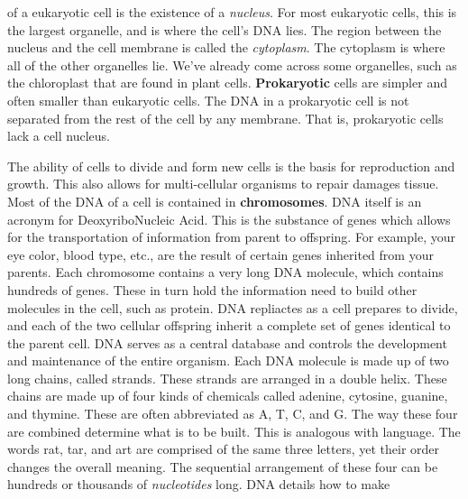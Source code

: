 \documentclass[crop=false,class=book,oneside]{standalone}
\begin{document}
        of a eukaryotic cell is the existence of a
        \textit{nucleus}. For most eukaryotic cells, this
        is the largest organelle, and is where the
        cell's DNA lies. The region between the
        nucleus and the cell membrane is called the
        \textit{cytoplasm}. The cytoplasm is where all of
        the other organelles lie. We've already come
        across some organelles, such as the chloroplast
        that are found in plant cells.
        \textbf{Prokaryotic} cells are simpler and often
        smaller than eukaryotic cells. The DNA
        in a prokaryotic cell is not separated from the
        rest of the cell by any membrane. That is,
        prokaryotic cells lack a cell nucleus.
        \par\hfill\par
        The ability of cells to divide and form new cells
        is the basis for reproduction and growth. This
        also allows for multi-cellular organisms to
        repair damages tissue. Most of the DNA of a cell
        is contained in \textbf{chromosomes}. DNA itself
        is an acronym for
        DeoxyriboNucleic Acid. This is the substance of
        genes which allows for the transportation of
        information from parent to offspring. For example,
        your eye color, blood type, etc., are the result
        of certain genes inherited from your parents.
        Each chromosome contains a very long DNA molecule,
        which contains hundreds of genes. These in turn
        hold the information need to build other molecules
        in the cell, such as protein. DNA repliactes as
        a cell prepares to divide, and each of the two
        cellular offspring inherit a complete set
        of genes identical to the parent cell. DNA
        serves as a central database and controls the
        development and maintenance of the entire
        organism. Each DNA molecule is made up of
        two long chains, called strands. These strands
        are arranged in a double helix. These chains are
        made up of four kinds of chemicals called
        adenine, cytosine, guanine, and thymine. These
        are often abbreviated as A, T, C, and G. The
        way these four are combined determine what is
        to be built. This is analogous with language.
        The words rat, tar, and art are comprised of the
        same three letters, yet their order changes the
        overall meaning. The sequential arrangement of
        these four can be hundreds or thousands of
        \textit{nucleotides} long. DNA details how to make
\end{document}
